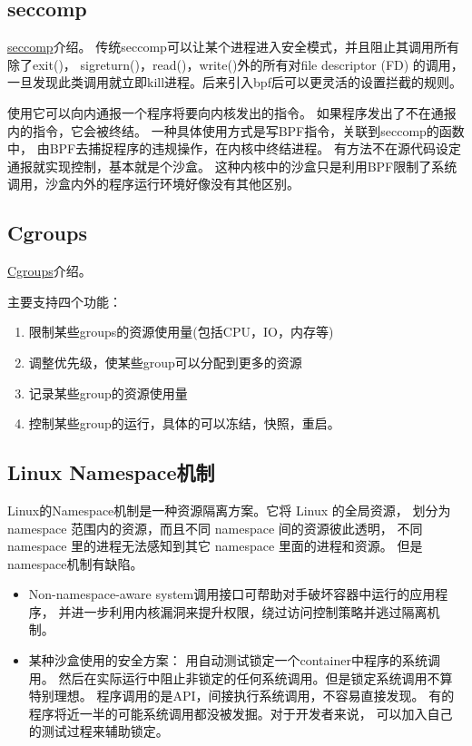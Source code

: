 \documentclass[AutoFakeBold,a4paper]{ctexart}
\begin{document}
\subsection{seccomp}

\href{https://en.wikipedia.org/wiki/Seccomp}{seccomp}介绍。
传统seccomp可以让某个进程进入安全模式，并且阻止其调用所有除了exit()，
sigreturn()，read()，write()外的所有对file descriptor (FD) 的调用，
一旦发现此类调用就立即kill进程。后来引入bpf后可以更灵活的设置拦截的规则。

使用它可以向内通报一个程序将要向内核发出的指令。
如果程序发出了不在通报内的指令，它会被终结。
一种具体使用方式是写BPF指令，关联到seccomp的函数中，
由BPF去捕捉程序的违规操作，在内核中终结进程。
有方法不在源代码设定通报就实现控制，基本就是个沙盒。
这种内核中的沙盒只是利用BPF限制了系统调用，沙盒内外的程序运行环境好像没有其他区别。
\cite{2020SandboxLinux}

\subsection{Cgroups}

\href{https://en.wikipedia.org/wiki/Cgroups}{Cgroups}介绍。

主要支持四个功能：
\begin{enumerate}
    \item 限制某些groups的资源使用量(包括CPU，IO，内存等)
    \item 调整优先级，使某些group可以分配到更多的资源
    \item 记录某些group的资源使用量
    \item 控制某些group的运行，具体的可以冻结，快照，重启。
\end{enumerate}

\subsection{Linux Namespace机制}

Linux的Namespace机制是一种资源隔离方案。它将 Linux 的全局资源，
划分为 namespace 范围内的资源，而且不同 namespace 间的资源彼此透明，
不同 namespace 里的进程无法感知到其它 namespace 里面的进程和资源。
但是namespace机制有缺陷。

\begin{itemize}
    \item Non-namespace-aware system调用接口可帮助对手破坏容器中运行的应用程序，
    并进一步利用内核漏洞来提升权限，绕过访问控制策略并逃过隔离机制。\cite{2019Practical}
    \item 某种沙盒使用的安全方案\cite{2019Practical}：
    用自动测试锁定一个container中程序的系统调用。
    然后在实际运行中阻止非锁定的任何系统调用。但是锁定系统调用不算特别理想。
    程序调用的是API，间接执行系统调用，不容易直接发现。
    有的程序将近一半的可能系统调用都没被发掘。对于开发者来说，
    可以加入自己的测试过程来辅助锁定。
\end{itemize}
\end{document}
